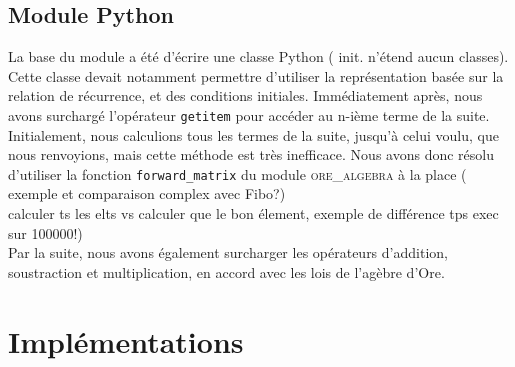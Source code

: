 \documentclass[12pt]{article}
\newlength{\charwidth}
\newcommand{\uline}{\underline{\hspace{2\charwidth}}}
\begin{document}
    \subsection{Module Python}
        \label{ssec:py}
        La base du module a été d'écrire une classe Python ({\color{red} init. n'étend aucun classes}). Cette classe devait notamment permettre
        d'utiliser la représentation basée sur la relation de récurrence, et des conditions initiales.
        Immédiatement après, nous avons surchargé l'opérateur \texttt{\uline getitem\uline } pour accéder
        au n-ième terme de la suite. Initialement, nous calculions tous les termes de la suite, jusqu'à 
        celui voulu, que nous renvoyions, mais cette méthode est très inefficace. Nous avons donc résolu
        d'utiliser la fonction \texttt{forward\_matrix} du module \textsc{ore\_algebra} à la place ({\color{red} exemple
        et comparaison complex avec Fibo?}) 
        \\{\color{red}calculer ts les elts vs calculer que le bon élement, exemple de différence tps exec sur 100000!})\\
        Par la suite, nous avons également surcharger les opérateurs d'addition, soustraction et multiplication, 
        en accord avec les lois de l'agèbre d'Ore.

\section{Implémentations}
\end{document}

